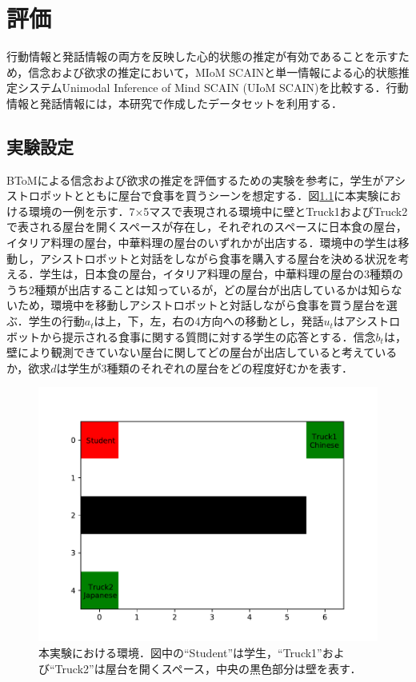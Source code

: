 \chapter{評価}
\par
行動情報と発話情報の両方を反映した心的状態の推定が有効であることを示すため，信念および欲求の推定において，MIoM SCAINと単一情報による心的状態推定システムUnimodal Inference of Mind SCAIN (UIoM SCAIN)を比較する．行動情報と発話情報には，本研究で作成したデータセットを利用する．


\section{実験設定}
\par

BToMによる信念および欲求の推定を評価するための実験を参考に，学生がアシストロボットとともに屋台で食事を買うシーンを想定する．図\ref{fig:ex_env1}に本実験における環境の一例を示す．7$\times$5マスで表現される環境中に壁とTruck1およびTruck2で表される屋台を開くスペースが存在し，それぞれのスペースに日本食の屋台，イタリア料理の屋台，中華料理の屋台のいずれかが出店する．環境中の学生は移動し，アシストロボットと対話をしながら食事を購入する屋台を決める状況を考える．学生は，日本食の屋台，イタリア料理の屋台，中華料理の屋台の3種類のうち2種類が出店することは知っているが，どの屋台が出店しているかは知らないため，環境中を移動しアシストロボットと対話しながら食事を買う屋台を選ぶ．学生の行動$a_t$は上，下，左，右の4方向への移動とし，発話$u_t$はアシストロボットから提示される食事に関する質問に対する学生の応答とする．信念$b_t$は，壁により観測できていない屋台に関してどの屋台が出店していると考えているか，欲求$d$は学生が3種類のそれぞれの屋台をどの程度好むかを表す．
\begin{figure}[htbp]
  \begin{center}
    \includegraphics[scale=0.7]{./ex_env1.pdf}
    \caption{本実験における環境．図中の``Student''は学生，``Truck1''および``Truck2''は屋台を開くスペース，中央の黒色部分は壁を表す．}
    \label{fig:ex_env1}
  \end{center}
\end{figure}


